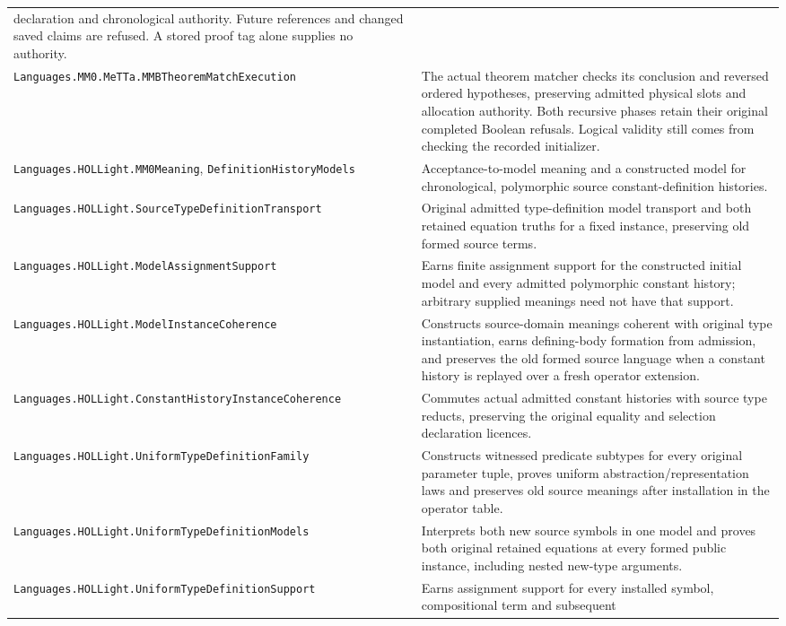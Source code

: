 \documentclass[11pt]{article}
\newcommand{\code}[1]{\nolinkurl{#1}}
\begin{document}
{\begin{longtable}{>{\raggedright\arraybackslash}p{.39\linewidth}>{\raggedright\arraybackslash}p{.55\linewidth}}
  declaration and chronological authority. Future references and changed
  saved claims are refused. A stored proof tag alone supplies no authority.\\
\code{Languages.MM0.MeTTa.MMBTheoremMatchExecution} & The actual theorem
  matcher checks its conclusion and reversed ordered hypotheses, preserving
  admitted physical slots and allocation authority. Both recursive phases
  retain their original completed Boolean refusals. Logical validity still
  comes from checking the recorded initializer.\\
\code{Languages.HOLLight.MM0Meaning}, \code{DefinitionHistoryModels} &
  Acceptance-to-model meaning and a constructed model for chronological,
  polymorphic source constant-definition histories.\\
\code{Languages.HOLLight.SourceTypeDefinitionTransport} & Original admitted
  type-definition model transport and both retained equation truths for a
  fixed instance, preserving old formed source terms.\\
\code{Languages.HOLLight.ModelAssignmentSupport} & Earns finite assignment
  support for the constructed initial model and every admitted polymorphic
  constant history; arbitrary supplied meanings need not have that support.\\
\code{Languages.HOLLight.ModelInstanceCoherence} & Constructs source-domain
  meanings coherent with original type instantiation, earns defining-body
  formation from admission, and preserves the old formed source language
  when a constant history is replayed over a fresh operator extension.\\
\code{Languages.HOLLight.ConstantHistoryInstanceCoherence} & Commutes actual
  admitted constant histories with source type reducts, preserving the
  original equality and selection declaration licences.\\
\code{Languages.HOLLight.UniformTypeDefinitionFamily} & Constructs witnessed
  predicate subtypes for every original parameter tuple, proves uniform
  abstraction/representation laws and preserves old source meanings after
  installation in the operator table.\\
\code{Languages.HOLLight.UniformTypeDefinitionModels} & Interprets both new
  source symbols in one model and proves both original retained equations
  at every formed public instance, including nested new-type arguments.\\
\code{Languages.HOLLight.UniformTypeDefinitionSupport} & Earns assignment
  support for every installed symbol, compositional term and subsequent

\end{longtable}}
\end{document}
